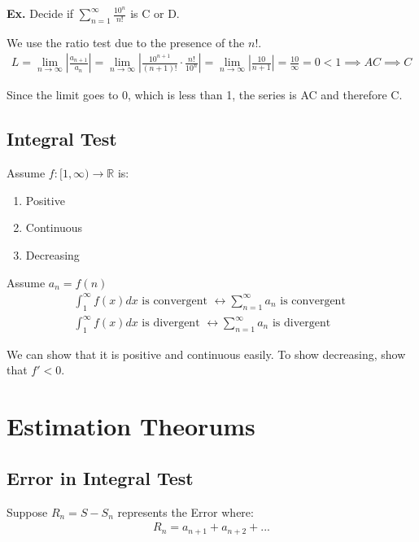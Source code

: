 \documentclass[12pt,letterpaper]{article} \usepackage{amsmath} \usepackage{graphicx}  \usepackage{longtable}  \usepackage{amssymb}
\begin{document}
        \begin{mdframed}
            \textbf{Ex.} Decide if $\sum^{\infty}_{n=1}\frac{10^n}{n!}$ is C or D.

            We use the ratio test due to the presence of the $n!$.
            \begin{align*}
                L = \lim_{n\to\infty}\left|\frac{a_{n+1}}{a_n}\right| = \lim_{n\to\infty}\left|\frac{10^{n+1}}{(n+1)!} \cdot \frac{n!}{10^n}\right| = \lim_{n\to\infty}\left|\frac{10}{n+1}\right| = \frac{10}{\infty} = 0 < 1 \implies AC \implies C
            \end{align*}

            Since the limit goes to 0, which is less than 1, the series is AC and therefore C. 
        \end{mdframed}

        \subsection{Integral Test}
        Assume $f:[1,\infty) \to \mathbb{R}$ is:
        \begin{enumerate}[noitemsep]
            \item Positive
            \item Continuous
            \item Decreasing
        \end{enumerate}
        Assume $a_n = f(n)$
        \begin{align*}
            \int_{1}^{\infty} f(x)dx \text{ is convergent } \leftrightarrow \sum_{n=1}^{\infty} a_n \text{ is convergent }\\
            \int_{1}^{\infty} f(x)dx \text{ is divergent } \leftrightarrow \sum_{n=1}^{\infty} a_n \text{ is divergent }
        \end{align*}

        We can show that it is positive and continuous easily. To show decreasing, show that $f'<0$. 

    \section{Estimation Theorums}

        \subsection{Error in Integral Test}
        Suppose $R_n = S-S_n$ represents the Error where:
        \begin{align*}
            R_n = a_{n+1} + a_{n+2} + ...
        \end{align*}
\end{document}
